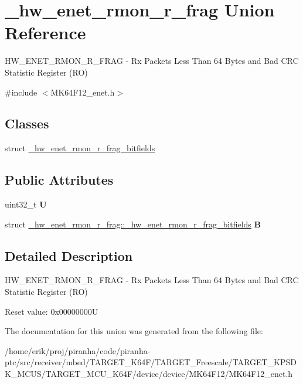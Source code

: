\hypertarget{union__hw__enet__rmon__r__frag}{}\section{\+\_\+hw\+\_\+enet\+\_\+rmon\+\_\+r\+\_\+frag Union Reference}
\label{union__hw__enet__rmon__r__frag}


H\+W\+\_\+\+E\+N\+E\+T\+\_\+\+R\+M\+O\+N\+\_\+\+R\+\_\+\+F\+R\+AG -\/ Rx Packets Less Than 64 Bytes and Bad C\+RC Statistic Register (RO)  




{\ttfamily \#include $<$M\+K64\+F12\+\_\+enet.\+h$>$}

\subsection*{Classes}
\begin{DoxyCompactItemize}
\item 
struct \hyperlink{struct__hw__enet__rmon__r__frag_1_1__hw__enet__rmon__r__frag__bitfields}{\+\_\+hw\+\_\+enet\+\_\+rmon\+\_\+r\+\_\+frag\+\_\+bitfields}
\end{DoxyCompactItemize}
\subsection*{Public Attributes}
\begin{DoxyCompactItemize}
\item 
uint32\+\_\+t {\bfseries U}\hypertarget{union__hw__enet__rmon__r__frag_a5f581b2cfe629f48efe56d772c6aa4eb}{}\label{union__hw__enet__rmon__r__frag_a5f581b2cfe629f48efe56d772c6aa4eb}

\item 
struct \hyperlink{struct__hw__enet__rmon__r__frag_1_1__hw__enet__rmon__r__frag__bitfields}{\+\_\+hw\+\_\+enet\+\_\+rmon\+\_\+r\+\_\+frag\+::\+\_\+hw\+\_\+enet\+\_\+rmon\+\_\+r\+\_\+frag\+\_\+bitfields} {\bfseries B}\hypertarget{union__hw__enet__rmon__r__frag_a18465b2991aad66c7c5a2c45713ad2c8}{}\label{union__hw__enet__rmon__r__frag_a18465b2991aad66c7c5a2c45713ad2c8}

\end{DoxyCompactItemize}


\subsection{Detailed Description}
H\+W\+\_\+\+E\+N\+E\+T\+\_\+\+R\+M\+O\+N\+\_\+\+R\+\_\+\+F\+R\+AG -\/ Rx Packets Less Than 64 Bytes and Bad C\+RC Statistic Register (RO) 

Reset value\+: 0x00000000U 

The documentation for this union was generated from the following file\+:\begin{DoxyCompactItemize}
\item 
/home/erik/proj/piranha/code/piranha-\/ptc/src/receiver/mbed/\+T\+A\+R\+G\+E\+T\+\_\+\+K64\+F/\+T\+A\+R\+G\+E\+T\+\_\+\+Freescale/\+T\+A\+R\+G\+E\+T\+\_\+\+K\+P\+S\+D\+K\+\_\+\+M\+C\+U\+S/\+T\+A\+R\+G\+E\+T\+\_\+\+M\+C\+U\+\_\+\+K64\+F/device/device/\+M\+K64\+F12/M\+K64\+F12\+\_\+enet.\+h\end{DoxyCompactItemize}
